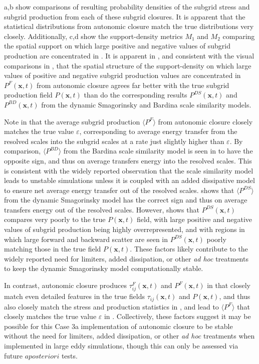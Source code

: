 a,b show comparisons of resulting probability densities of the subgrid stress and subgrid production from each of these subgrid closures. It is apparent that the statistical distributions from autonomic closure match the true distributions very closely.  Additionally, c,d show the support-density metrics $M_1$  and $M_2$   comparing the spatial support on which large positive and negative values of subgrid production are concentrated in . It is apparent in , and consistent with the visual comparisons in , that the spatial structure of the support-density on which large values of positive and negative subgrid production values are concentrated in  $P^{F}(\mathbf{x},t)$  from autonomic closure agrees far better with the true subgrid production field $P(\mathbf{x},t)$  than do the corresponding results $P^{DS}(\mathbf{x},t)$  and $P^{BD}(\mathbf{x},t)$ from the dynamic Smagorinsky and Bardina scale similarity models.

Note in  that the average subgrid production $\langle P^F \rangle$  from autonomic closure closely matches the true value $\varepsilon$, corresponding to average energy transfer from the resolved scales into the subgrid scales at a rate just slightly higher than $\varepsilon$. By comparison,  $\langle P^{BD} \rangle$ from the Bardina scale similarity model is seen in  to have the opposite sign, and thus on average transfers energy into the resolved scales. This is consistent with the widely reported observation that the scale similarity model leads to unstable simulations unless it is coupled with an added dissipative model to ensure net average energy transfer out of the resolved scales.  shows that $\langle P^{DS} \rangle$  from the dynamic Smagorinsky model has the correct sign and thus on average transfers energy out of the resolved scales. However,  shows that $P^{DS}(\mathbf{x},t)$  compares very poorly to the true  $P(\mathbf{x},t)$ field, with large positive and negative values of subgrid production being highly overrepresented, and with regions in which large forward and backward scatter are seen in  $P^{DS}(\mathbf{x},t)$ poorly matching those in the true field $P(\mathbf{x},t)$. These factors likely contribute to the widely reported need for limiters, added dissipation, or other \textit{ad hoc} treatments to keep the dynamic Smagorinsky model computationally stable. 

In contrast, autonomic closure produces $\tau_{ij}^F(\mathbf{x},t)$ and  $P^F(\mathbf{x},t)$ in  that closely match even detailed features in the true fields $\tau_{ij}(\mathbf{x},t)$ and  $P(\mathbf{x},t)$, and thus also closely match the stress and production statistics in , and lead to $\langle P^F \rangle$  that closely matches the true value $\varepsilon$ in . Collectively, these factors suggest it may be possible for this Case 3a implementation of autonomic closure to be stable without the need for limiters, added dissipation, or other \textit{ad hoc} treatments when implemented in large eddy simulations, though this can only be assessed via future $a posteriori$ tests. 

